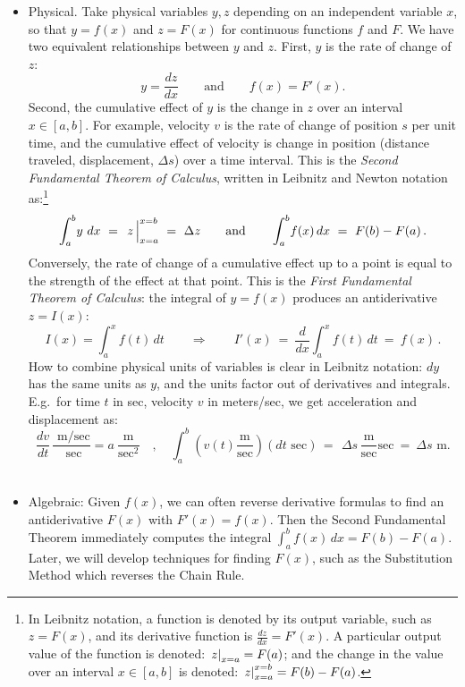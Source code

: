 \documentclass[11pt]{article}
\begin{document}
\begin{itemize}
\item Physical. Take physical variables $y,z$ depending on an independent variable $x$, 
so that $y=f(x)$ and $z=F(x)$ for continuous functions $f$ and $F$.
We have two equivalent relationships between $y$ and $z$. 
First, $y$ is the rate of change of $z$:
$$y=\frac{dz}{dx} \qquad\text{and}\qquad f(x)=F'(x).$$
Second, the cumulative effect of $y$ is the change in $z$ over an interval $x\in[a,b]$.
For example, velocity $v$ is the rate of change of position $s$ per unit time, 
and the cumulative effect of velocity is change in position (distance traveled, displacement, $\Delta s$) 
over a time interval.
This is the {\it Second Fundamental Theorem of Calculus},
written in Leibnitz and Newton notation as:\footnote{
In Leibnitz notation, a function is denoted by its output variable, such as $z=F(x)$,
and its derivative function is $\frac{dz}{dx} = F'(x)$.
A particular output value of the function is denoted: $\left.\vphantom{\sum}z\right|_{x=a}=F(a)$;
and the change in the value over an interval $x\in[a,b]$
is denoted: $\left.\vphantom{\sum}z\right|_{x=a}^{x=b} = F(b)-F(a)$.
}
$$
\int_a^b\! y\ dx \ =\ \left.\vphantom{\sum}z\,\right|_{x=a}^{x=b}\ =\ \Delta z 
\qquad\text{and}\qquad
\int_a^b\! f(x)\,dx \ =\ F(b)-F(a)\,.
$$
Conversely, the rate of change of a cumulative effect up to a point
is equal to the strength of the effect at that point.
This is the {\it First Fundamental Theorem of Calculus}: 
the integral of $y=f(x)$ produces an antiderivative $z=I(x)$:
$$
I(x) = \int_a^x f(t)\,dt
\qquad\Longrightarrow\qquad
I'(x) \ =\ \frac{d}{dx} \int_a^x\! f(t)\,dt \ =\ f(x)\,.
$$
How to combine physical units of variables is clear in Leibnitz notation: $dy$ has the same units as $y$,
and the units factor out of derivatives and integrals. E.g.~for 
time $t$ in sec, velocity $v$ in meters/sec, we get acceleration and displacement as:
$$
\frac{dv}{dt} \,\frac{\text{ m/sec}}{\text{ sec}} = a \ \frac{\text{m}}{\text{sec}^2}
\quad,\quad \int_a^b \left(v(t)\frac{\text{m}}{\text{sec}}\right)\!(dt\text{ sec}) \,=\,  
\ \Delta s\, \frac{\text{m}}{\text{sec}}\text{sec}\ =\ \Delta s \text{ m}.
$$
\\[.8em]

\item Algebraic: Given $f(x)$, we can often reverse derivative formulas to find 
an antiderivative $F(x)$ with $F'(x)=f(x)$. 
Then the Second Fundamental Theorem immediately computes the integral $\int_a^b f(x)\,dx = F(b)-F(a)$. 
Later, we will develop techniques for finding $F(x)$, 
such as the Substitution Method which reverses the Chain Rule.

\end{itemize}
\end{document}
